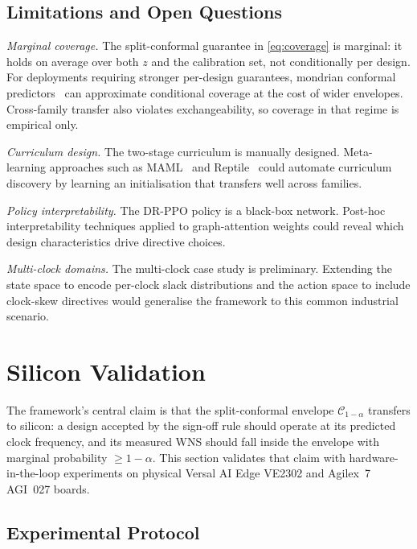 \documentclass[journal]{IEEEtran}
\begin{document}
\subsection{Limitations and Open Questions}

\emph{Marginal coverage.} The split-conformal guarantee in \eqref{eq:coverage} is marginal: it holds on average over both $z$ and the calibration set, not conditionally per design. For deployments requiring stronger per-design guarantees, mondrian conformal predictors~\cite{vovk2022random} can approximate conditional coverage at the cost of wider envelopes. Cross-family transfer also violates exchangeability, so coverage in that regime is empirical only.

\emph{Curriculum design.} The two-stage curriculum is manually designed. Meta-learning approaches such as MAML~\cite{finn2017maml} and Reptile~\cite{nichol2018reptile} could automate curriculum discovery by learning an initialisation that transfers well across families.

\emph{Policy interpretability.} The DR-PPO policy is a black-box network. Post-hoc interpretability techniques applied to graph-attention weights could reveal which design characteristics drive directive choices.

\emph{Multi-clock domains.} The multi-clock case study is preliminary. Extending the state space to encode per-clock slack distributions and the action space to include clock-skew directives would generalise the framework to this common industrial scenario.


\section{Silicon Validation}
\label{sec:silicon}

The framework's central claim is that the split-conformal envelope $\mathcal{C}_{1-\alpha}$ transfers to silicon: a design accepted by the sign-off rule should operate at its predicted clock frequency, and its measured WNS should fall inside the envelope with marginal probability $\geq 1-\alpha$. This section validates that claim with hardware-in-the-loop experiments on physical Versal AI Edge VE2302 and Agilex~7 AGI~027 boards.

\subsection{Experimental Protocol}
\label{sec:silicon-protocol}
\end{document}
